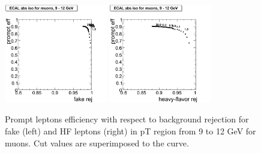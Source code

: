\begin{figure}[htbp]
\begin{center}

 \includegraphics[width = 0.4\textwidth]{pictures/trackCut/bkgdRej_sigEff/muon_fake_ptCut2_ptCut3.png}
\includegraphics[width = 0.4\textwidth]{pictures/trackCut/bkgdRej_sigEff/muon_nonPrompt_ptCut2_ptCut3.png}
\caption{\small{Prompt leptons efficiency with respect to background 
rejection for fake (left) and HF leptons (right) in pT region
from 9 to 12 GeV for muons. 
Cut values are superimposed to the curve.}\label{fig:ecalrej_mu3}}
\end{center}
\end{figure}

